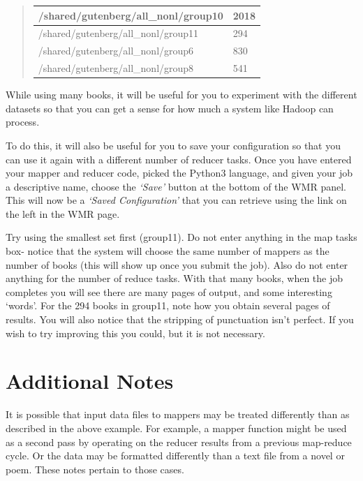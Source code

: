 \documentclass[letterpaper,10pt,openany,oneside]{sphinxmanual}
\begin{document}
\begin{enumerate}
\begin{quote}
\begin{tabulary}{\linewidth}{|L|L|}
/shared/gutenberg/all\_nonl/group10
 & 
2018
\\\hline

/shared/gutenberg/all\_nonl/group11
 & 
294
\\\hline

/shared/gutenberg/all\_nonl/group6
 & 
830
\\\hline

/shared/gutenberg/all\_nonl/group8
 & 
541
\\\hline
\end{tabulary}

\end{quote}

While using many books, it will be useful for you to experiment
with the different datasets so that you can get a sense for how
much a system like Hadoop can process.

To do this, it will also be useful for you to save your
configuration so that you can use it again with a different number
of reducer tasks. Once you have entered your mapper and reducer
code, picked the Python3 language, and given your job a descriptive
name, choose the \emph{`Save'} button at the bottom of the WMR panel.
This will now be a \emph{`Saved Configuration'} that you can retrieve
using the link on the left in the WMR page.

Try using the smallest set first (group11). Do not enter anything
in the map tasks box- notice that the system will choose the same
number of mappers as the number of books (this will show up once
you submit the job). Also do not enter anything for the number of
reduce tasks. With that many books, when the job completes you will
see there are many pages of output, and some interesting `words'.
For the 294 books in group11, note how you obtain several pages of
results. You will also notice that the stripping of punctuation
isn't perfect. If you wish to try improving this you could, but it
is not necessary.

\end{enumerate}


\section{Additional Notes}
\label{wmr_basic/wmr_multi_language:additional-notes}
It is possible that input data files to mappers may be treated
differently than as described in the above example. For example, a
mapper function might be used as a second pass by operating on the
reducer results from a previous map-reduce cycle. Or the data may
be formatted differently than a text file from a novel or poem.
These notes pertain to those cases.
\end{document}
